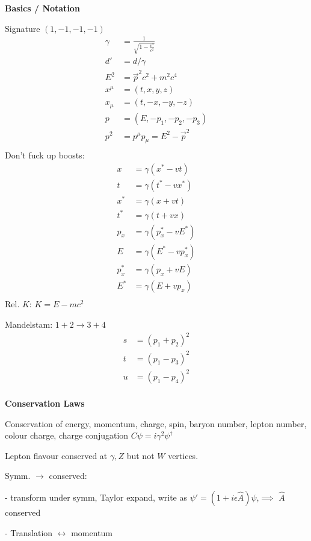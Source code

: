 \documentclass[10pt,letterpaper]{article}
\newcommand{\0}{\mathcal{O}}
\begin{document}
\begin{multicols}{3}
\textbf{Basics / Notation}

Signature $(1, -1, -1, -1)$
\begin{align*}
    \gamma &= \frac{1}{\sqrt{1 - \frac{v^2}{c^2}}}\\
    d' &= d/\gamma\\
    E^2 &= \vec{p}^2c^2 + m^2c^4 \\
    x^\mu &= (t, x, y, z) \\
    x_\mu &= (t, -x, -y, -z) \\
    p &= (E, -p_1, -p_2, -p_3) \\
    p^2 &= p^\mu p_\mu = E^2 - \vec{p}^2 \\
\end{align*}
Don't fuck up boosts:
\begin{align*}
    x &= \gamma (x^* - vt) \\
    t &= \gamma (t^* - vx^*) \\
    x^* &= \gamma (x + vt) \\
    t^* &= \gamma (t + vx) \\
    p_x &= \gamma (p_x^* - vE^*) \\
    E &= \gamma (E^* - vp_x^*) \\
    p_x^* &= \gamma (p_x + vE) \\
    E^* &= \gamma (E + vp_x) \\
\end{align*}
Rel. $K$: $K = E - mc^2$

Mandelstam: $1+2 \to 3+4$
\begin{align*}
    s &= (p_1 + p_2)^2 \\
    t &= (p_1 - p_3)^2 \\
    u &= (p_1 - p_4)^2 \\
\end{align*}

\textbf{Conservation Laws}

Conservation of energy, momentum, charge, spin, baryon number, lepton number, colour charge, charge conjugation $C\psi = i\gamma^2 \psi^\dagger$

Lepton flavour conserved at $\gamma, Z$ but not $W$ vertices.

Symm. $\to$ conserved:

- transform under symm, Taylor expand, write as $\psi' = (1 + i\epsilon \hat{A})\psi$,$\implies$ $\hat{A}$ conserved

- Translation $\leftrightarrow$ momentum


\end{multicols}
\end{document}
